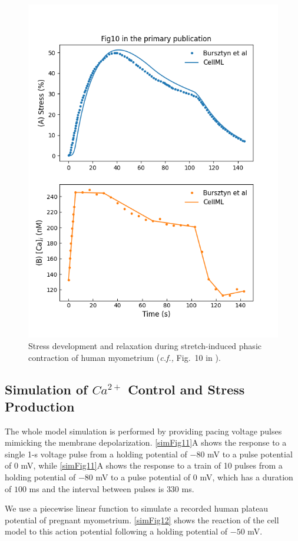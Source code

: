 \documentclass[fleqn,10pt]{physiome}
\begin{document}
\begin{figure}
\begin{minipage}[t]{\dimexpr.5\textwidth-0.2em}
  \includegraphics[width=0.9\linewidth]{./figs/simFig10.png}
  \caption{Stress development and relaxation during stretch-induced phasic contraction of human myometrium (\emph{c.f.,} Fig.~10 in \citet{bursztyn2007mathematical}).}
  \label{simFig10}
\end{minipage}
\end{figure}


\subsection{Simulation of $Ca^{2+}$ Control and Stress Production}
The whole model simulation is performed by providing pacing voltage pulses mimicking the membrane depolarization. \autoref{simFig11}A shows the response to a single 1-s voltage pulse from a holding potential of $-80$ mV to a pulse potential of $0$ mV, while \autoref{simFig11}A shows the response to a train of 10 pulses from a holding potential of $-80$ mV to a pulse potential of $0$ mV, which has a duration of $100$ ms and the interval between pulses is $330$ ms.

We use a piecewise linear function to simulate a recorded human plateau potential of pregnant myometrium. \autoref{simFig12} shows the reaction of the cell model to this action potential following a holding potential of $-50$ mV.
\end{document}
